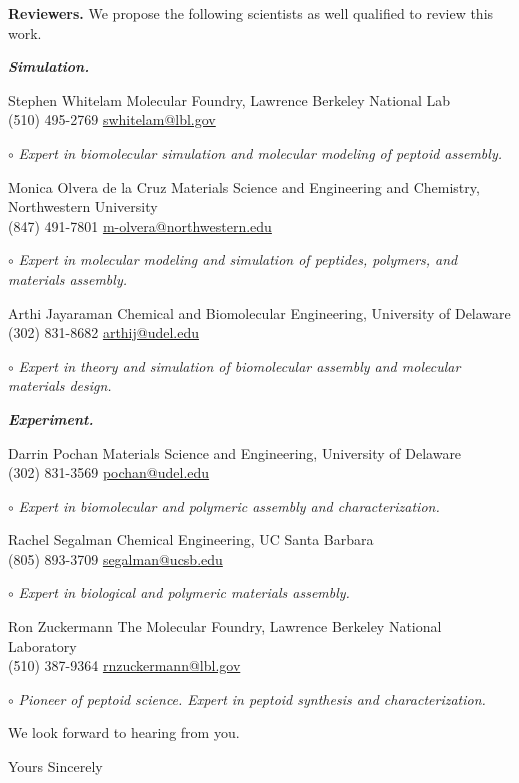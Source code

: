 \documentclass[11pt,a4paper]{letter} %
\begin{document}
\begin{letter}
\textbf{Reviewers.} We propose the following scientists as well qualified to review this work.

\textbf{\textit{Simulation.}}

Stephen Whitelam \hfill Molecular Foundry, Lawrence Berkeley National Lab \\
(510) 495-2769 \hfill \url{swhitelam@lbl.gov}

$\circ$ \textit{Expert in biomolecular simulation and molecular modeling of peptoid assembly.}

Monica Olvera de la Cruz \hfill Materials Science and Engineering and Chemistry, Northwestern University \\
(847) 491-7801 \hfill \url{m-olvera@northwestern.edu}

$\circ$ \textit{Expert in molecular modeling and simulation of peptides, polymers, and materials assembly.}

Arthi Jayaraman \hfill Chemical and Biomolecular Engineering, University of Delaware \\
(302) 831-8682 \hfill \url{arthij@udel.edu}

$\circ$ \textit{Expert in theory and simulation of biomolecular assembly and molecular materials design.}

\textbf{\textit{Experiment.}}

Darrin Pochan \hfill Materials Science and Engineering, University of Delaware \\
(302) 831-3569 \hfill \url{pochan@udel.edu}

$\circ$ \textit{Expert in biomolecular and polymeric assembly and characterization.}

Rachel Segalman \hfill Chemical Engineering, UC Santa Barbara \\
(805) 893-3709 \hfill \url{segalman@ucsb.edu}

$\circ$ \textit{Expert in biological and polymeric materials assembly.}

Ron Zuckermann \hfill The Molecular Foundry, Lawrence Berkeley National Laboratory \\
(510) 387-9364 \hfill \url{rnzuckermann@lbl.gov}

$\circ$ \textit{Pioneer of peptoid science. Expert in peptoid synthesis and characterization.}


We look forward to hearing from you.

\closing{Yours Sincerely}

\end{letter}




%
%
\end{document}
